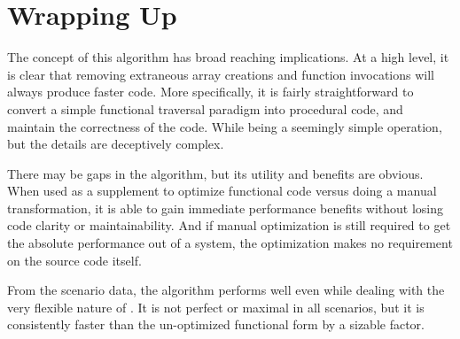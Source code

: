 \section{Wrapping Up}
The concept of this algorithm has broad reaching implications.  At a high level, it is clear that removing extraneous array creations and function invocations will always produce faster code.  More specifically, it is fairly straightforward to convert a simple functional traversal paradigm into procedural code, and maintain the correctness of the code. While being a seemingly simple operation, but the details are deceptively complex.

There may be gaps in the algorithm, but its utility and benefits are obvious.  When used as a supplement to optimize functional code versus doing a manual transformation, it is able to gain immediate performance benefits without losing code clarity or maintainability.  And if manual optimization is still required to get the absolute performance out of a system, the optimization makes no requirement on the source code itself.    

From the scenario data, the algorithm performs well even while dealing with the very flexible nature of \javascript. It is not perfect or maximal in all scenarios, but it is consistently faster than the un-optimized functional form by a sizable factor.